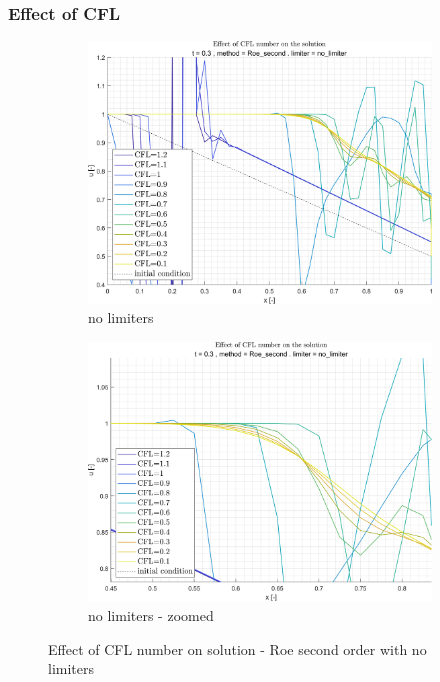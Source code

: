 \documentclass[11pt, a4paper]{article}
\begin{document}
\subsubsection{Effect of CFL}
\begin{figure}[H]
    \centering
    \begin{subfigure}[c]{.49\textwidth}
        \centering
        \includegraphics[width=\textwidth]{images/grap2.png}
        \caption{no limiters}
        \label{fig:roe_second_no_limiter_A}
    \end{subfigure}
    \hfill
    \begin{subfigure}[c]{.49\textwidth}
        \centering
        \includegraphics[width=\textwidth]{images/grap2.1.png}
        \caption{no limiters - zoomed}
        \label{fig:roe_second_no_limiter_B}
    \end{subfigure}
    \caption{Effect of CFL number on solution - Roe second order with no limiters}
    \label{fig:roe_second_no_limiter}
\end{figure}
\end{document}
